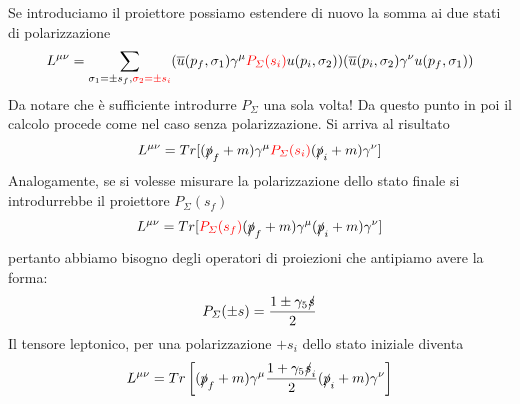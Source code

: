 Se introduciamo il proiettore possiamo estendere di nuovo la somma ai due stati di polarizzazione
$$
L^{\mu\nu} = \sum_{\sigma_1=\pm s_f, \textcolor{red}{\sigma_2=\pm s_i}} (\overline{u}(p_f, \sigma_1)\gamma^\mu \textcolor{red}{P_\Sigma(s_i)} u(p_i, \sigma_2))(\overline{u}(p_i, \sigma_2)\gamma^\nu u(p_f, \sigma_1))
$$
Da notare che è sufficiente introdurre $P_\Sigma$ una sola volta! Da questo punto in poi il calcolo procede come nel caso senza polarizzazione. Si arriva al risultato
$$
L^{\mu\nu} = Tr[(\slashed{p}_f + m)\gamma^\mu \textcolor{red}{P_\Sigma(s_i)}(\slashed{p}_i + m)\gamma^\nu]
$$
Analogamente, se si volesse misurare la polarizzazione dello stato finale si introdurrebbe il proiettore $P_\Sigma(s_f)$
$$
L^{\mu\nu} = Tr[\textcolor{red}{P_\Sigma(s_f)}(\slashed{p}_f + m)\gamma^\mu (\slashed{p}_i + m)\gamma^\nu]
$$
pertanto abbiamo bisogno degli operatori di proiezioni che antipiamo avere la forma:
$$
P_\Sigma(\pm s) = \frac{1 \pm \gamma_5 \slashed{s}}{2}
$$
Il tensore leptonico, per una polarizzazione $+s_i$ dello stato iniziale diventa
$$
L^{\mu\nu} = Tr\left[(\slashed{p}_f + m)\gamma^\mu \frac{1 + \gamma_5 \slashed{s}_i}{2} (\slashed{p}_i + m)\gamma^\nu\right]
$$
